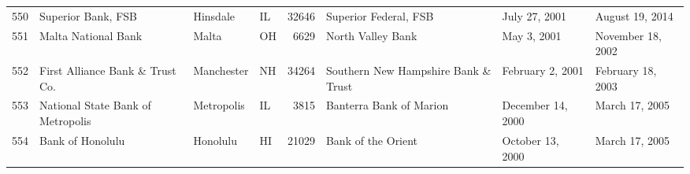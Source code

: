 \begin{tabular}{llllrlll}
550 &                                 Superior Bank, FSB &            Hinsdale &  IL &  32646 &                              Superior Federal, FSB &       July 27, 2001 &     August 19, 2014 \\
551 &                                Malta National Bank &               Malta &  OH &   6629 &                                  North Valley Bank &         May 3, 2001 &   November 18, 2002 \\
552 &                    First Alliance Bank \& Trust Co. &          Manchester &  NH &  34264 &                Southern New Hampshire Bank \& Trust &    February 2, 2001 &   February 18, 2003 \\
553 &                  National State Bank of Metropolis &          Metropolis &  IL &   3815 &                            Banterra Bank of Marion &   December 14, 2000 &      March 17, 2005 \\
554 &                                   Bank of Honolulu &            Honolulu &  HI &  21029 &                                 Bank of the Orient &    October 13, 2000 &      March 17, 2005 \\
\bottomrule
\end{tabular}
